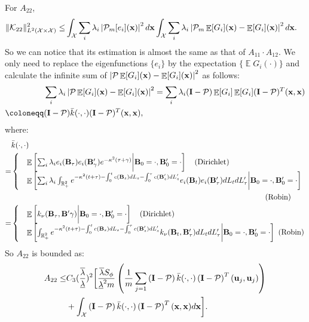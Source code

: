 \documentclass[aos,preprint]{imsart}
\theoremstyle{plain}
\DeclareMathOperator{\E}{\mathbb E}
\newcommand{\Real}{\mathbb R}
\newcommand{\CalX}{\mathcal X}
\newcommand{\CalP}{\mathcal P}
\newcommand{\CalK}{\mathcal K}
\newcommand{\Bx}{\bold x}
\newcommand{\BFx}{\bold x}
\newcommand{\BB}{\bold B}
\newcommand{\Bu}{\bold u}
\theoremstyle{remark}
\begin{document}
\begin{appendix}
For $A_{22}$, 
\begin{align*}
    \|\CalK_{22}\|^2_{L^2(\CalX\times \CalX)}\leq &\int_\CalX\sum_i\lambda_i\left|\CalP_m[e_i](\Bx)\right|^2d\BFx\int_\CalX\sum_i\lambda_i\left|\CalP_m\E[G_i](\BFx)-\E[G_i](\BFx)\right|^2d\BFx.
\end{align*}
So we can notice that its estimation is almost the same as that of $A_{11}\cdot A_{12} $. We only need to replace the eigenfunctions $\{e_i\}$ by the expectation  $\{\E G_i(\cdot)\}$ and calculate the infinite sum of $\left|\CalP\E[G_i](\BFx)-\E[G_i](\BFx)\right|^2$ as follows:
\begin{align*}
    &\sum_i\lambda_i \left|\CalP\E[G_i](\BFx)-\E[G_i](\BFx)\right|^2=\sum_i\lambda_i(\bold{I}-\CalP)\E[G_i]\E[G_i](\bold{I}-\CalP)^T(\BFx,\BFx)\\
     \coloneqq &(\bold{I}-\CalP)\bar{k}(\cdot,\cdot)(\bold{I}-\CalP)^T(\BFx,\BFx),
     \end{align*}
     where:
\begin{align*}     
    &\bar{k}(\cdot,\cdot)\\
    =& \begin{cases}
        &\E\left[\sum_i\lambda_ie_i(\BB_\tau)e_i(\BB_\gamma')e^{-\kappa^2(\tau+\gamma)}\bigg|\BB_0=\cdot,\BB'_0=\cdot\right]\quad\text{(Dirichlet)}\\
        & \E\left[\sum_i\lambda_i\int_{\Real_+^2}e^{-\kappa^2(t+\tau)-\int_0^tc(\BB_s)dL_s-\int_0^\tau c(\BB'_s)dL'_s}e_i(\BB_t)e_i(\BB'_\tau)dL_tdL'_\tau\bigg|\BB_0=\cdot,\BB'_0=\cdot\right]
    \end{cases}\\
    & {\quad\quad\quad\quad\quad\quad\quad\quad\quad\quad\quad\quad\quad\quad\quad\quad\quad\quad\quad\quad\quad\quad\quad\quad\quad\quad\quad\quad\quad\quad\quad\quad\quad \  \text{(Robin)}}\\
    =&\begin{cases}
        &\E\left[k_\nu(\BB_\tau,\BB'\gamma)\bigg|\BB_0=\cdot,\BB'_0=\cdot\right]\quad\text{(Dirichlet)}\\
        &\E\left[\int_{\Real_+^2}e^{-\kappa^2(t+\tau)-\int_0^tc(\BB_s)dL_s-\int_0^\tau c(\BB'_s)dL'_s}k_\nu(\BB_t,\BB'_\tau)dL_tdL'_\tau\bigg|\BB_0=\cdot,\BB'_0=\cdot\right]\  \text{(Robin)}
    \end{cases}
\end{align*}
So $A_{22}$ is bounded as:
\begin{align*}
 A_{22}
    \leq&C_3(\frac{\overline{\lambda}}{\underline{\lambda}})^2\bigg[\frac{\overline{\lambda}S_\phi}{\underline{\lambda}^2m}\left(\frac{1}{m}\sum_{j=1}\left(\bold{I}-\CalP\right)\bar{k}(\cdot,\cdot)\left(\bold{I}-\CalP\right)^T(\Bu_j,\Bu_j)\right)\\
    &+\int_\CalX\left(\bold{I}-\CalP\right) \bar{k}(\cdot,\cdot)\left(\bold{I}-\CalP\right)^T(\BFx,\BFx)d\Bx\bigg].
\end{align*}


\end{appendix}
\end{document}
